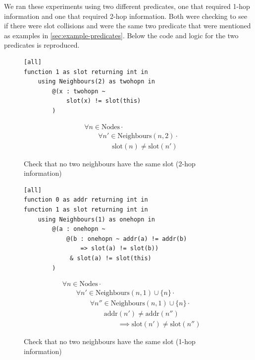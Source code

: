 We ran these experiments using two different predicates, one that required 1-hop information and one that required 2-hop information. Both were checking to see if there were slot collisions and were the same two predicate that were mentioned as examples in \autoref{sec:example-predicates}. Below the code and logic for the two predicates is reproduced.

\begin{figure}[H]
\begin{minipage}{.5\linewidth}
\begin{lstlisting}
[all]
function 1 as slot returning int in
    using Neighbours(2) as twohopn in
        @(x : twohopn ~
            slot(x) != slot(this)
        )
\end{lstlisting}
\end{minipage}%
\begin{minipage}{.5\linewidth}
\begin{align*}
&				\forall n \in \text{Nodes} \cdot \\
& \hspace{2em}		\forall n' \in \text{Neighbours}(n, 2) \cdot \\
& \hspace{4em}				\text{slot}(n) \neq \text{slot}(n')
\end{align*}
\end{minipage}

\caption{Check that no two neighbours have the same slot (2-hop information)}
\label{fig:two-hop-slot-pred-lang-results}
\end{figure}

\begin{figure}[H]
\begin{minipage}{.5\linewidth}
\begin{lstlisting}
[all]
function 0 as addr returning int in
function 1 as slot returning int in
    using Neighbours(1) as onehopn in
        @(a : onehopn ~
            @(b : onehopn ~ addr(a) != addr(b)
                => slot(a) != slot(b))
             & slot(a) != slot(this)
        )
\end{lstlisting}
\end{minipage}%
\begin{minipage}{.5\linewidth}
\begin{align*}
&				\forall n \in \text{Nodes} \cdot \\
& \hspace{2em}		\forall n' \in \text{Neighbours}(n, 1) \cup \{n\} \cdot \\
& \hspace{4em}			\forall n'' \in \text{Neighbours}(n, 1) \cup \{n\} \cdot \\
& \hspace{6em}				\text{addr}(n') \not= \text{addr}(n'') \\
& \hspace{8em}					\implies \text{slot}(n') \neq \text{slot}(n'')
\end{align*}
\end{minipage}
\caption{Check that no two neighbours have the same slot (1-hop information)}
\label{fig:one-hop-slot-pred-lang-results}
\end{figure}

